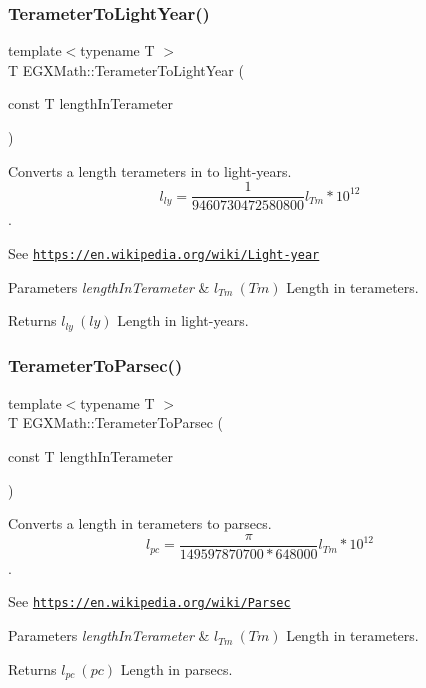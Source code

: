 \subsubsection{\texorpdfstring{Terameter\+To\+Light\+Year()}{TerameterToLightYear()}}
{\footnotesize\ttfamily template$<$typename T $>$ \\
T E\+G\+X\+Math\+::\+Terameter\+To\+Light\+Year (\begin{DoxyParamCaption}\item[{const T}]{length\+In\+Terameter }\end{DoxyParamCaption})}



Converts a length terameters in to light-\/years. \[ l_{ly}= \frac{1}{9460730472580800} l_{Tm} * 10^{12} \]. 

See \href{https://en.wikipedia.org/wiki/Light-year}{\tt https\+://en.\+wikipedia.\+org/wiki/\+Light-\/year} 
\begin{DoxyParams}{Parameters}
{\em length\+In\+Terameter} & $ l_{Tm}\ (Tm)$ Length in terameters. \\
\hline
\end{DoxyParams}
\begin{DoxyReturn}{Returns}
$ l_{ly}\ (ly)$ Length in light-\/years. 
\end{DoxyReturn}
\mbox{\label{group___e_g_x_math-_conversions-_length_conversions-_s_i-_terameter-_astronomical_gac203b94b19db6ed8181e78413fafcf58}} 
\subsubsection{\texorpdfstring{Terameter\+To\+Parsec()}{TerameterToParsec()}}
{\footnotesize\ttfamily template$<$typename T $>$ \\
T E\+G\+X\+Math\+::\+Terameter\+To\+Parsec (\begin{DoxyParamCaption}\item[{const T}]{length\+In\+Terameter }\end{DoxyParamCaption})}



Converts a length in terameters to parsecs. \[ l_{pc}=\frac{\pi}{149597870700 * 648000} l_{Tm} * 10^{12} \]. 

See \href{https://en.wikipedia.org/wiki/Parsec}{\tt https\+://en.\+wikipedia.\+org/wiki/\+Parsec} 
\begin{DoxyParams}{Parameters}
{\em length\+In\+Terameter} & $ l_{Tm}\ (Tm)$ Length in terameters. \\
\hline
\end{DoxyParams}
\begin{DoxyReturn}{Returns}
$ l_{pc}\ (pc)$ Length in parsecs. 
\end{DoxyReturn}
